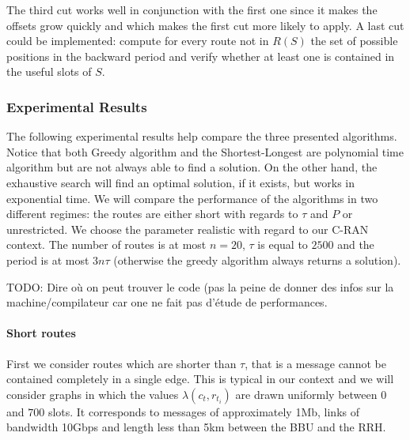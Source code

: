 \documentclass[a4paper,10pt]{article}
\newcommand{\todo}[1]{{\color{red} TODO: {#1}}}
\begin{document}
      
      The third cut works well in conjunction with the first one since it makes the offsets grow quickly and 
      which makes the first cut more likely to apply. A last cut could be implemented: compute for every route not in $R(S)$ the set of possible positions in the backward period and verify whether at least one is contained in the useful slots of $S$.


    \subsubsection{Experimental Results}\label{sec:experimental_results}
      
      The following experimental results help compare the three presented algorithms.
      Notice that both Greedy algorithm and the Shortest-Longest are polynomial time algorithm but are not always able to find a solution. On the other hand, the exhaustive search will find an optimal solution, if it exists, but works in exponential time. We will compare the performance of the algorithms in two different regimes: the routes are either short with regards to $\tau$ and $P$ or unrestricted.
      We choose the parameter realistic with regard to our C-RAN context. The number of routes 
      is at most $n = 20$, $\tau$ is equal to $2500$ and the period is at most $3n\tau$ (otherwise the greedy algorithm always returns a solution). 
      
      \todo{Dire où on peut trouver le code (pas la peine de donner des infos sur la machine/compilateur car one ne fait pas d'étude de performances.}
%             
% 

      \paragraph{Short routes}
      
      First we consider routes which are shorter than $\tau$, that is a message cannot be contained 
      completely in a single edge. This is typical in our context and we will consider graphs in which the values $\lambda(c_t,r_{t_i})$ are drawn uniformly between $0$ and $700$ slots. It corresponds to messages of approximately 1Mb, links of bandwidth 10Gbps and length less than 5km between the BBU and the RRH. 
      
\end{document}
